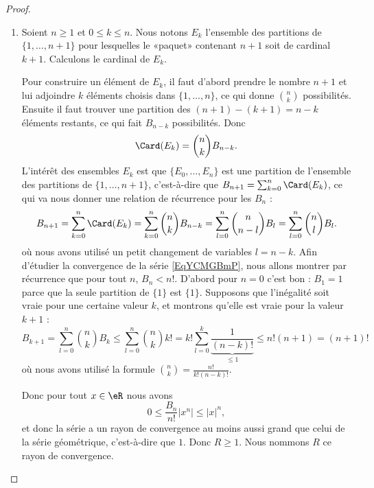 \begin{proof}
    \begin{enumerate}
        \item
            Soient \( n\geq 1\) et \( 0\leq k\leq n\). Nous notons \( E_k\) l'ensemble des partitions de \( \{ 1,\ldots, n+1 \}\) pour lesquelles le «paquet» contenant \( n+1\) soit de cardinal \( k+1\). Calculons le cardinal de \( E_k\).

            Pour construire un élément de \( E_k\), il faut d'abord prendre le nombre \( n+1\) et lui adjoindre \( k\) éléments choisis dans \( \{ 1,\ldots, n \}\), ce qui donne \( n\choose k\) possibilités. Ensuite il faut trouver une partition des \( (n+1)-(k+1)=n-k\) éléments restants, ce qui fait \( B_{n-k}\) possibilités. Donc
            \begin{equation}
                \Card(E_k)={n\choose k}B_{n-k}.
            \end{equation}
            L'intérêt des ensembles \( E_k\) est que \( \{ E_0,\ldots, E_n \}\) est une partition de l'ensemble des partitions de \( \{ 1,\ldots, n+1 \}\), c'est-à-dire que \( B_{n+1}=\sum_{k=0}^n\Card(E_k)\), ce qui va nous donner une relation de récurrence pour les \( B_n\) :
\begin{equation}
                    B_{n+1}=\sum_{k=0}^n\Card(E_k)
                   =\sum_{k=0}^n{n\choose k}B_{n-k}
                    =\sum_{l=0}^n{n\choose n-l}B_l
                    =\sum_{l=0}^n{n\choose l}B_l.
\end{equation}
où nous avons utilisé un petit changement de variables \( l=n-k\). Afin d'étudier la convergence de la série \eqref{EqYCMGBmP}, nous allons montrer par récurrence que pour tout \( n\), \( B_n<n!\). D'abord pour \( n=0\) c'est bon : \( B_1=1\) parce que la seule partition de \( \{ 1 \}\) est \( \{ 1 \}\). Supposons que l'inégalité soit vraie pour une certaine valeur \( k\), et montrons qu'elle est vraie pour la valeur \( k+1\) :
\begin{equation}
                    B_{k+1}=\sum_{l=0}^n{n\choose k}B_k
                   \leq \sum_{l=0}^n{n\choose k}k!
                    =k!\sum_{l=0}^k\underbrace{\frac{1}{ (n-k)! }}_{\leq 1}
                    \leq n!(n+1)
                    =(n+1)!
\end{equation}
            où nous avons utilisé la formule \( {n\choose k}=\frac{ n! }{ k!(n-k)! }\).

            Donc pour tout \( x\in \eR\) nous avons
            \begin{equation}
                0\leq \frac{ B_n }{ n! }| x^n |\leq | x |^n,
            \end{equation}
            et donc la série a un rayon de convergence au moins aussi grand que celui de la série géométrique, c'est-à-dire que \( 1\). Donc \( R\geq 1\). Nous nommons \( R\) ce rayon de convergence.


\end{enumerate}
\end{proof}
